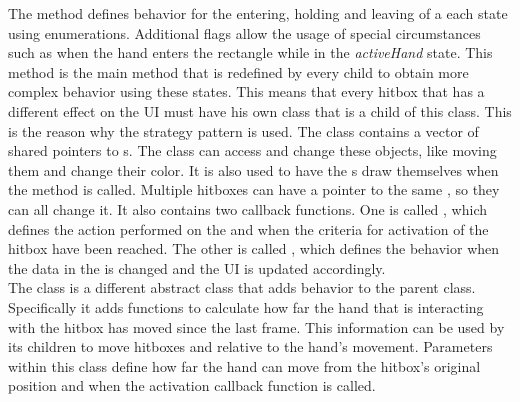 The  method defines behavior for the entering, holding and leaving of a each state using enumerations. Additional flags allow the usage of special circumstances such as when the hand enters the rectangle while in the \emph{activeHand} state. This  method is the main method that is redefined by every child to obtain more complex behavior using these states. This means that every hitbox that has a different effect on the UI must have his own class that is a child of this class. This is the reason why the strategy pattern is used. The class contains a vector of shared pointers to s. The class can access and change these objects, like moving them and change their color. It is also used to have the s draw themselves when the method  is called. Multiple hitboxes can have a pointer to the same , so they can all change it. It also contains two callback functions. One is called , which defines the action performed on the  and  when the criteria for activation of the hitbox have been reached. The other is called , which defines the behavior when the data in the  is changed and the UI is updated accordingly.\\


The  class is a different abstract class that adds behavior to the parent class. Specifically it adds functions to calculate how far the hand that is interacting with the hitbox has moved since the last frame. This information can be used by its children to move hitboxes and  relative to the hand's movement. Parameters within this class define how far the hand can move from the hitbox's original position and when the activation callback function is called.\\

